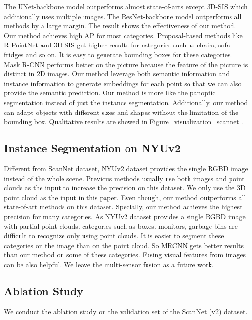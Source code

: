 \documentclass{article}
\begin{document}
The UNet-backbone model outperforms almost state-of-arts except 3D-SIS which additionally uses multiple images. The ResNet-backbone model outperforms all methods by a large margin. The result shows the effectiveness of our method. Our method achieves high AP for most categories. Proposal-based methods like R-PointNet and 3D-SIS get higher results for categories such as chairs, sofa, fridges and so on. It is easy to generate bounding boxes for these categories. Mask R-CNN performs better on the picture because the feature of the picture is distinct in 2D images. Our method leverage both semantic information and instance information to generate embeddings for each point so that we can also provide the semantic prediction. Our method is more like the panoptic segmentation instead of just the instance segmentation. Additionally, our method can adapt objects with different sizes and shapes without the limitation of the bounding box.
Qualitative results are showed in Figure~\ref{visualization_scannet}. 


\subsection{Instance Segmentation on NYUv2}

Different from ScanNet dataset, NYUv2 dataset provides the single RGBD image instead of the whole scene. Previous methods usually use both images and point clouds as the input to increase the precision on this dataset. We only use the 3D point cloud as the input in this paper. Even though, our method outperforms all state-of-art methods on this dataset. Specially, our method achieves the highest precision for many categories. As NYUv2 dataset provides a single RGBD image with partial point clouds, categories such as boxes, monitors, garbage bins are difficult to recognize only using point clouds. It is easier to segment these categories on the image than on the point cloud. So MRCNN gets better results than our method on some of these categories. Fusing visual features from images can be also helpful. We leave the multi-sensor fusion as a future work.



\subsection{Ablation Study}



We conduct the ablation study on the validation set of the ScanNet (v2) dataset.
\end{document}
